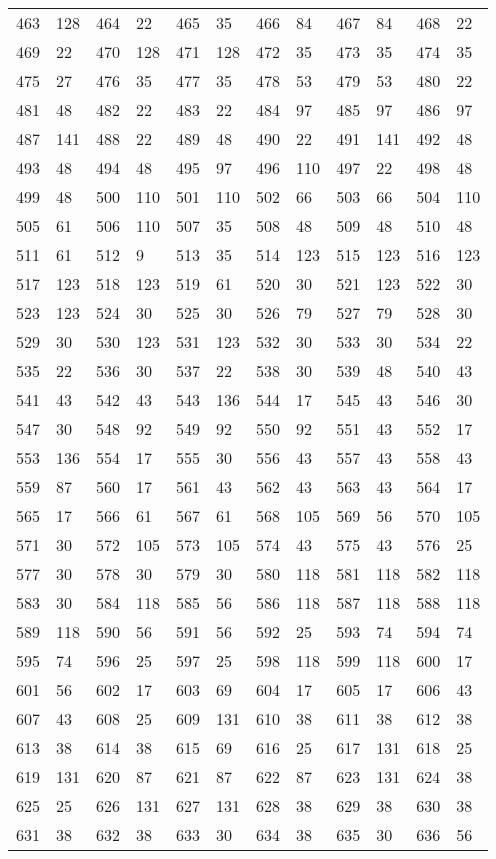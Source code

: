 \begin{longtable}{llllllllllll}
463 & 128&464 &22&465& 35&466 &84&467 &84&468& 22\\
469 & 22&470 &128&471& 128&472 &35&473 &35&474& 35\\
475 & 27&476 &35&477& 35&478 &53&479 &53&480& 22\\
481 & 48&482 &22&483& 22&484 &97&485 &97&486& 97\\
487 & 141&488 &22&489& 48&490 &22&491 &141&492& 48\\
493 & 48&494 &48&495& 97&496 &110&497 &22&498& 48\\
499 & 48&500 &110&501& 110&502 &66&503 &66&504& 110\\
505 & 61&506 &110&507& 35&508 &48&509 &48&510& 48\\
511 & 61&512 &9&513& 35&514 &123&515 &123&516& 123\\
517 & 123&518 &123&519& 61&520 &30&521 &123&522& 30\\
523 & 123&524 &30&525& 30&526 &79&527 &79&528& 30\\
529 & 30&530 &123&531& 123&532 &30&533 &30&534& 22\\
535 & 22&536 &30&537& 22&538 &30&539 &48&540& 43\\
541 & 43&542 &43&543& 136&544 &17&545 &43&546& 30\\
547 & 30&548 &92&549& 92&550 &92&551 &43&552& 17\\
553 & 136&554 &17&555& 30&556 &43&557 &43&558& 43\\
559 & 87&560 &17&561& 43&562 &43&563 &43&564& 17\\
565 & 17&566 &61&567& 61&568 &105&569 &56&570& 105\\
571 & 30&572 &105&573& 105&574 &43&575 &43&576& 25\\
577 & 30&578 &30&579& 30&580 &118&581 &118&582& 118\\
583 & 30&584 &118&585& 56&586 &118&587 &118&588& 118\\
589 & 118&590 &56&591& 56&592 &25&593 &74&594& 74\\
595 & 74&596 &25&597& 25&598 &118&599 &118&600& 17\\
601 & 56&602 &17&603& 69&604 &17&605 &17&606& 43\\
607 & 43&608 &25&609& 131&610 &38&611 &38&612& 38\\
613 & 38&614 &38&615& 69&616 &25&617 &131&618& 25\\
619 & 131&620 &87&621& 87&622 &87&623 &131&624& 38\\
625 & 25&626 &131&627& 131&628 &38&629 &38&630& 38\\
631 & 38&632 &38&633& 30&634 &38&635 &30&636& 56\\

\end{longtable}
